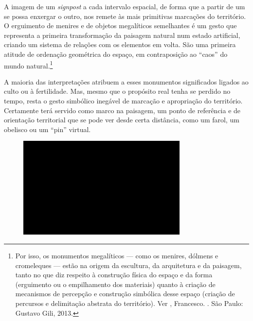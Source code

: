 A imagem de um \emph{signpost} a cada intervalo espacial, de forma que a
partir de um se possa enxergar o outro, nos remete às mais primitivas
marcações do território. O erguimento de menires e de objetos
megalíticos semelhantes é um gesto que representa a primeira
transformação da paisagem natural num estado artificial, criando um
sistema de relações com os elementos em volta. São uma primeira atitude
de ordenação geométrica do espaço, em contraposição ao ``caos'' do mundo
natural.\footnote{Por isso, os monumentos megalíticos --- como os
  menires, dólmens e cromeleques --- estão na origem da escultura, da
  arquitetura e da paisagem, tanto no que diz respeito à construção
  física do espaço e da forma (erguimento ou o empilhamento dos
  materiais) quanto à criação de mecanismos de percepção e construção
  simbólica desse espaço (criação de percursos e delimitação abstrata do
  território). Ver , Francesco. {}. São Paulo: Gustavo Gili, 2013.}

A maioria das interpretações atribuem a esses monumentos significados
ligados ao culto ou à fertilidade. Mas, mesmo que o propósito real tenha
se perdido no tempo, resta o gesto simbólico inegável de marcação e
apropriação do território. Certamente terá servido como marco na
paisagem, um ponto de referência e de orientação territorial que se pode
ver desde certa distância, como um farol, um obelisco ou um ``pin''
virtual.

\begin{figure}[!ht]
\centering
 \includegraphics[width=85mm]{./imgs/im1.jpg}
\caption{\tiny{}}
\end{figure}

